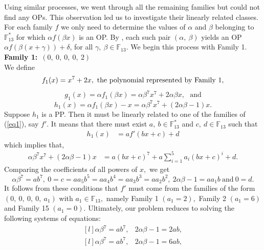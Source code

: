 \documentclass[12pt,a4wide, reqno]{amsart}
\theoremstyle{definition}
\theoremstyle{remark}
\numberwithin{equation}{section}
\begin{document}
Using similar processes, we went through all the remaining families but could not find any OPs. This observation led us to investigate their linearly related classes. For each family $f$ we only need to determine the values of $\alpha$ and $\beta$ belonging to $\mathbb{F}_{13}^*$ for which $\alpha f(\beta x)$ is an OP. By , each such pair $(\alpha,~\beta)$ yields an OP $\alpha f(\beta (x+\gamma))+\delta$, for all $\gamma,~\beta\in\mathbb{F}_{13}.$ We begin this process with Family 1.
\vspace{0.2 cm}\\
\textbf{Family 1:}~$(0,~0,~0,~0,~2)$\\ 
 We define 
$$f_1(x)=x^7+2x,~\textup{the polynomial represented by Family 1},$$
$$g_1(x)=\alpha f_1(\beta x)=\alpha \beta^7x^7+2\alpha \beta x,~~~\text{and}$$
$$h_1(x)=\alpha f_1(\beta x)-x=\alpha \beta^7x^7+(2\alpha \beta-1) x.$$
Suppose $h_1$ is a PP. Then it must be linearly related to one of the families of  (\ref{eq1}), say $f'$. It means that there must exist $a,~b\in\mathbb{F}_{13}^*$ and $c,~d\in\mathbb{F}_{13}$ such that
\begin{equation*}
    \begin{aligned}
        h_1(x)&=af'(bx+c)+d
        \end{aligned}
\end{equation*}
which implies that,
\begin{equation*}
    \begin{aligned}
        \alpha \beta^7x^7+(2\alpha \beta-1) x&=a(bx+c)^7+a\sum_{i=1}^{5}a_i(bx+c)^i+d.
        \end{aligned}
\end{equation*}
Comparing the coefficients of all powers of $x,$ we get
$$\alpha \beta^7=ab^7,~0=c=aa_5b^5=aa_4b^4=aa_3b^3=aa_2b^2,~2\alpha \beta-1=aa_1b~\text{and}~0=d.$$
It follows from these conditions that $f'$ must come from the families of the form $(0,~0,~0,~0,~a_1)$ with $a_1\in\mathbb{F}_{13},$ namely Family 1 $(a_1=2),$ Family 2 $(a_1=6)$ and Family 15 $(a_1=0).$ Ultimately, our problem reduces to solving the following systems of equations:
\begin{equation}\label{eq4}
    \begin{matrix*}[l]
         \alpha \beta ^7=ab^7, & 2\alpha \beta -1=2ab,
    \end{matrix*}
\end{equation}
\begin{equation}\label{eq5}
    \begin{matrix*}[l]
         \alpha \beta ^7=ab^7, & 2\alpha \beta -1=6ab,
    \end{matrix*}
\end{equation}
\end{document}
